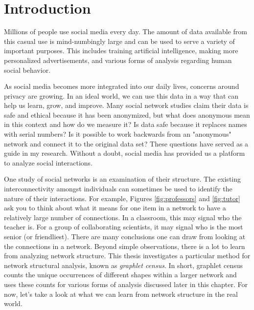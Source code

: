 \documentclass[12pt,twoside]{reedthesis}
\begin{document}
	

	\chapter{Introduction}
Millions of people use social media every day. The amount of data available from this casual use is mind-numbingly large and can be used to serve a variety of important purposes. This includes training artificial intelligence, making more personalized advertisements, and various forms of analysis regarding human social behavior. 

As social media becomes more integrated into our daily lives, concerns around privacy are growing. In an ideal world, we can use this data in a way that can help us learn, grow, and improve. Many social network studies claim their data is safe and ethical because it has been anonymized, but what does anonymous mean in this context and how do we measure it? Is data safe because it replaces names with serial numbers? Is it possible to work backwards from an "anonymous" network and connect it to the original data set? These questions have served as a guide in my research. Without a doubt, social media has provided us a platform to analyze social interactions.

One study of social networks is an examination of their structure. The existing interconnectivity amongst individuals can sometimes be used to identify the nature of their interactions. For example, Figures \ref{fig:professors} and \ref{fig:tutor} ask you to think about what it means for one item in a network to have a relatively large number of connections. In a classroom, this may signal who the teacher is. For a group of collaborating scientists, it may signal who is the most senior (or friendliest). There are many conclusions one can draw from looking at the connections in a network. Beyond simple observations, there is a lot to learn from analyzing network structure. This thesis investigates a particular method for network structural analysis, known as \textit{graphlet census}. In short, graphlet census counts the unique occurrences of different shapes within a larger network and uses these counts for various forms of analysis discussed later in this chapter. For now, let's take a look at what we can learn from network structure in the real world.
	
\end{document}
